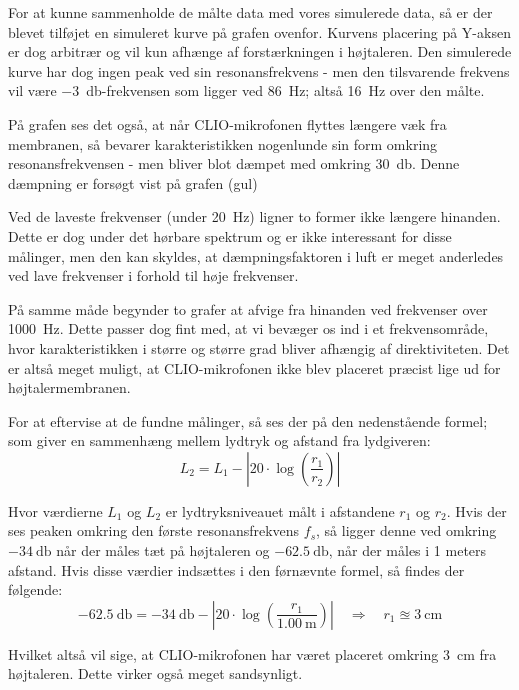 \newpage
For at kunne sammenholde de målte data med vores simulerede data, så er der blevet tilføjet en simuleret kurve på grafen ovenfor. Kurvens placering på Y-aksen er dog arbitrær og vil kun afhænge af forstærkningen i højtaleren. Den simulerede kurve har dog ingen peak ved sin resonansfrekvens -  men den tilsvarende frekvens vil være \SI{-3}{\decibel}-frekvensen som ligger ved \SI{86}{\hertz}; altså \SI{16}{\hertz} over den målte.

På grafen ses det også, at når CLIO-mikrofonen flyttes længere væk fra membranen, så bevarer karakteristikken nogenlunde sin form omkring resonansfrekvensen - men bliver blot dæmpet med omkring \SI{30}{\decibel}. Denne dæmpning er forsøgt vist på grafen (gul)

Ved de laveste frekvenser (under \SI{20}{\hertz}) ligner to former ikke længere hinanden. Dette er dog under det hørbare spektrum og er ikke interessant for disse målinger, men den kan skyldes, at dæmpningsfaktoren i luft er meget anderledes ved lave frekvenser i forhold til høje frekvenser.

På samme måde begynder to grafer at afvige fra hinanden ved frekvenser over \SI{1000}{\hertz}. Dette passer dog fint med, at vi bevæger os ind i et frekvensområde, hvor karakteristikken i større og større grad bliver afhængig af direktiviteten. Det er altså meget muligt, at CLIO-mikrofonen ikke blev placeret præcist lige ud for højtalermembranen.

For at eftervise at de fundne målinger, så ses der på den nedenstående formel; som giver en sammenhæng mellem lydtryk og afstand fra lydgiveren:
\begin{equation}
L_2 = L_1 - \left| 20 \cdot \log \left( \frac{r_1}{r_2} \right) \right|
\end{equation}

Hvor værdierne $L_1$ og $L_2$ er lydtryksniveauet målt i afstandene $r_1$ og $r_2$. Hvis der ses peaken omkring den første resonansfrekvens $f_s$, så ligger denne ved omkring $-\SI{34}{\decibel}$ når der måles tæt på højtaleren og $-\SI{62.5}{\decibel}$, når der måles i 1 meters afstand. Hvis disse værdier indsættes i den førnævnte formel, så findes der følgende:
\begin{equation}
\SI{-62.5}{\decibel} = \SI{-34}{\decibel} - \left| 20 \cdot \log \left( \frac{r_1}{\SI{1.00}{\meter}} \right)\right| \quad \Rightarrow \quad r_1 \approxeq \SI{3}{\centi\meter}
\end{equation}

Hvilket altså vil sige, at CLIO-mikrofonen har været placeret omkring \SI{3}{\centi\meter} fra højtaleren. Dette virker også meget sandsynligt.
